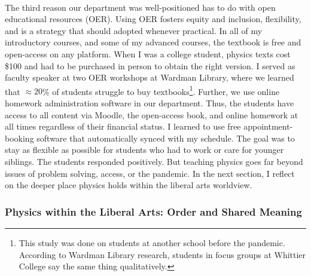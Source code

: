 \documentclass[../../../main.tex]{subfiles}
\begin{document}
\\
\vspace{0.25cm}
The third reason our department was well-positioned has to do with open educational resources (OER).  Using OER fosters equity and inclusion, flexibility, and is a strategy that should adopted whenever practical.  In all of my introductory courses, and some of my advanced courses, the textbook is free and open-access on any platform.  When I was a college student, physics texts cost \$100 and had to be purchased in person to obtain the right version.  I served as faculty speaker at two OER workshops at Wardman Library, where we learned that $\approx 20$\% of students struggle to buy textbooks\footnote{This study was done on students at another school before the pandemic.  According to Wardman Library research, students in focus groups at Whittier College say the same thing qualitatively.}.  Further, we use online homework administration software in our department.  Thus, the students have access to all content via Moodle, the open-access book, and online homework at all times regardless of their financial status.  I learned to use free appointment-booking software that automatically synced with my schedule.  The goal was to stay as flexible as possible for students who had to work or care for younger siblings.  The students responded positively.  But teaching physics goes far beyond issues of problem solving, access, or the pandemic.  In the next section, I reflect on the deeper place physics holds within the liberal arts worldview.

\subsubsection{Physics within the Liberal Arts: Order and Shared Meaning}
\end{document}
